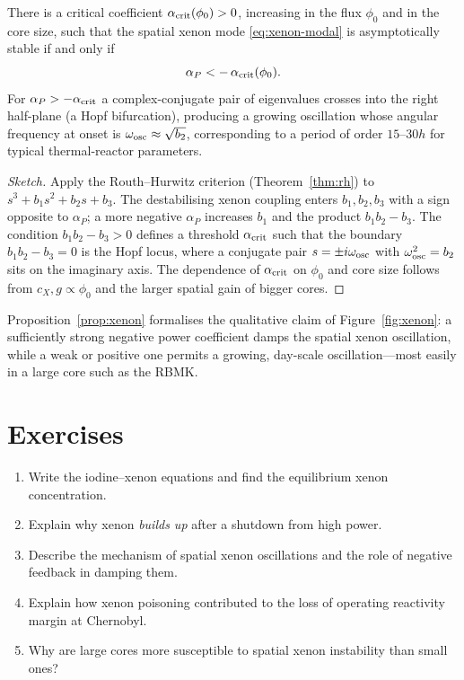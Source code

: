 \begin{proposition}
\label{prop:xenon}
There is a critical coefficient $\alpha_{\rm crit}(\phi_0)>0$, increasing in the
flux $\phi_0$ and in the core size, such that the spatial xenon mode
\eqref{eq:xenon-modal} is asymptotically stable if and only if
\begin{equation}
\alpha_P < -\,\alpha_{\rm crit}(\phi_0).
\end{equation}
For $\alpha_P>-\alpha_{\rm crit}$ a complex-conjugate pair of eigenvalues crosses
into the right half-plane (a Hopf bifurcation), producing a growing oscillation
whose angular frequency at onset is
$\omega_{\rm osc}\approx\sqrt{b_2}$, corresponding to a period of order
$15$--$30\unit{h}$ for typical thermal-reactor parameters.
\end{proposition}
\begin{proof}[Sketch]
Apply the Routh--Hurwitz criterion (Theorem~\ref{thm:rh}) to
$s^3+b_1s^2+b_2s+b_3$. The destabilising xenon coupling enters $b_1,b_2,b_3$ with a
sign opposite to $\alpha_P$; a more negative $\alpha_P$ increases $b_1$ and the
product $b_1b_2-b_3$. The condition $b_1b_2-b_3>0$ defines a threshold
$\alpha_{\rm crit}$ such that the boundary $b_1b_2-b_3=0$ is the Hopf locus, where a
conjugate pair $s=\pm i\omega_{\rm osc}$ with $\omega_{\rm osc}^2=b_2$ sits on the
imaginary axis. The dependence of $\alpha_{\rm crit}$ on $\phi_0$ and core size
follows from $c_X,g\propto\phi_0$ and the larger spatial gain of bigger cores.
\end{proof}

Proposition~\ref{prop:xenon} formalises the qualitative claim of
Figure~\ref{fig:xenon}: a sufficiently strong negative power coefficient damps the
spatial xenon oscillation, while a weak or positive one permits a growing,
day-scale oscillation---most easily in a large core such as the RBMK.


\section*{Exercises}
\begin{enumerate}[leftmargin=*,itemsep=2pt]
\item Write the iodine--xenon equations and find the equilibrium xenon concentration.
\item Explain why xenon \emph{builds up} after a shutdown from high power.
\item Describe the mechanism of spatial xenon oscillations and the role of negative feedback in damping them.
\item Explain how xenon poisoning contributed to the loss of operating reactivity margin at Chernobyl.
\item Why are large cores more susceptible to spatial xenon instability than small ones?
\end{enumerate}
